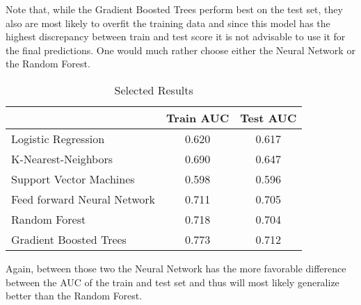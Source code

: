 Note that, while the Gradient Boosted Trees perform best on the test set, they also are most likely to overfit the training data and since this model has the highest discrepancy between train and test score it is not advisable to use it for  the final predictions. One would much rather choose either the Neural Network or the Random Forest. 

\begin{wraptable}{r}{7.5cm}
\centering
\caption{Selected Results}
\tiny
\begin{tabular}{lcc}

                            & Train AUC & Test AUC \\ \hline
Logistic Regression         & 0.620     & 0.617    \\
K-Nearest-Neighbors         & 0.690     & 0.647    \\
Support Vector Machines     & 0.598     & 0.596    \\
Feed forward Neural Network & 0.711     & 0.705    \\
Random Forest               & 0.718     & 0.704    \\
Gradient Boosted Trees      & 0.773     & 0.712   
\end{tabular}
\end{wraptable}


Again, between those two the Neural Network has the more favorable difference between the AUC of the train and test set and thus will most likely generalize better 
than the Random Forest.
